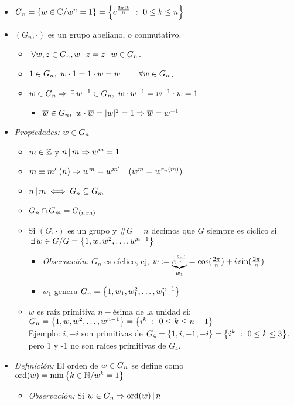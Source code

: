 \documentclass[12pt,a4paper, spanish]{article}
\begin{document}
\begin{itemize}
	\item $G_n = \left\{ w \in \mathbb C / w^n = 1 \right\} = \left\{ e^{\frac{2\pi i k}{n}}\ :\ 0\leq k \leq n \right\}$

	\item $(G_n, \cdot)$ es un grupo abeliano, o conmutativo.
	      \begin{itemize}
		      \item $\;\forall w, z \in G_n, w\cdot z = z \cdot w \in G_n$.
		      \item $1 \in G_n,\ w \cdot 1 = 1 \cdot w = w\qquad \;\forall w \in G_n$.
		      \item $w \in G_n \Rightarrow \,\exists\, w^{-1} \in G_n,\ w \cdot w^{-1} = w^{-1}\cdot w = 1$
		            \begin{itemize}
			            \item $\overline w \in G_n,\ w \cdot \overline w = |w|^2 = 1 \Rightarrow \overline w = w^{-1}$
		            \end{itemize}
	      \end{itemize}
	\item \textit{Propiedades: $w \in G_n$}
	      \begin{itemize}
		      \item $m \in \mathbb Z$ y $n \, | \, m \Rightarrow w^m = 1$
		      \item $m \equiv m' \;(n) \Rightarrow w^m = w^{m'}\quad (w^m = w^{r_n(m)})$
		      \item $n \, | \, m \iff G_n \subseteq G_m$
		      \item $G_n \cap G_m = G_{(n:m)}$
		      \item Si $(G, \cdot)$ es un grupo y $\#G = n$ decimos que $G$ siempre es cíclico si
		            $\,\exists\, w\in G / G = \left\{ 1,w, w^2,\dots, w^{n-1} \right\}$\\
		            \begin{itemize}
			            \item \textit{Observación: } $G_n$ es cíclico, ej, $w := \underbrace{e^\frac{2\pi i}{n}}_{w_1} = \cos(\frac{2\pi}{n}) + i \sin(\frac{2\pi}{n})$
			            \item $w_1$ genera $G_n = \left\{ 1, w_1, w_1^2,\dots,w_1^{n-1} \right\}$
		            \end{itemize}
		      \item $w$ es raíz primitiva $n-$ésima de la unidad si: $G_n = \left\{ 1,w,w^2,\dots,w^{n-1} \right\} = \left\{ i^k\ :\ 0\leq k \leq n-1 \right\}$\\
		            Ejemplo: $i, -i$ son primitivas de $G_4 = \left\{ 1,i,-1,-i \right\} = \left\{ i^k\ :\ 0 \leq k \leq 3 \right\}$, pero 1 y -1 no son raíces primitivas de $G_4$.
	      \end{itemize}
	\item \textit{Definición: } El orden de $w \in G_n$ se define como $\text{ord}(w) = \text{min}\left\{ k \in \mathbb N / w^k = 1 \right\}$
	      \begin{itemize}
		      \item \textit{Observación: } Si $w \in G_n \Rightarrow \text{ord}(w) \, | \, n$
	      \end{itemize}
\end{itemize}
\end{document}
